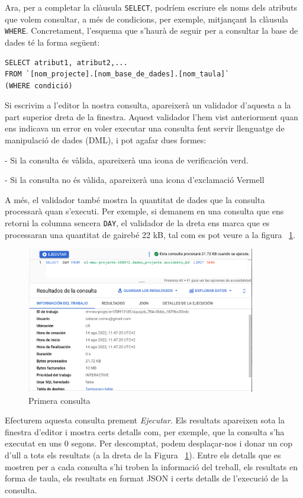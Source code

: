 \documentclass[12pt,longbibliography]{article}
\theoremstyle{definition}
\theoremstyle{remark}
\begin{document}
Ara, per a completar la clàusula \verb|SELECT|, podríem escriure els noms dels atributs que volem consultar, a més de condicions, per exemple, mitjançant la clàusula \verb|WHERE|. Concretament, l'esquema que s'haurà de seguir per a consultar la base de dades té la forma següent:


\begin{verbatim}
SELECT atribut1, atribut2,...
FROM `[nom_projecte].[nom_base_de_dades].[nom_taula]`
(WHERE condició)
\end{verbatim}



Si escrivim a l’editor la nostra consulta, apareixerà un validador d’aquesta a la part superior dreta de la finestra. Aquest validador l'hem vist anteriorment quan ens indicava un error en voler executar una consulta fent servir llenguatge de manipulació de dades (DML), i pot agafar dues formes:

- Si la consulta és vàlida, apareixerà una icona de verificación verd.

- Si la consulta no és vàlida, apareixerà una icona d’exclamació Vermell

A més, el validador també mostra la quantitat de dades que la consulta processarà quan s’executi. Per exemple, si demanem en una consulta que ens retorni la columna sencera \verb|DAY|, el validador de la dreta ens marca que es processaran una quantitat de gairebé 22 kB, tal com es pot veure a la figura ~\ref{fig:bq19}.


\begin{figure}[h!]
\begin{center}
\includegraphics[width=10cm]{bq19}
\end{center}
\caption{Primera consulta}
\label{fig:bq19}
\end{figure}


Efecturem aquesta consulta prement \textit{Ejecutar}. Els resultats apareixen sota la finestra d'editor i mostra certs detalls com, per exemple, que la consulta s'ha executat en uns 0 segons. Per descomptat, podem desplaçar-nos i donar un cop d'ull a tots els resultats (a la dreta de la Figura ~\ref{fig:bq19}). Entre els detalls que es mostren per a cada consulta s'hi troben la informació del treball, els resultats en forma de taula, els resultats en format JSON i certs detalls de l'execució de la consulta. 
\end{document}
